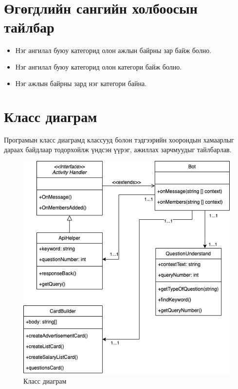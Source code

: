 \section{Өгөгдлийн сангийн холбоосын тайлбар}
\begin{itemize}
  \item Нэг ангилал буюу категорид олон ажлын байрны зар байж болно.
  \item Нэг ангилал буюу категорид олон категори байж болно. 
  \item Нэг ажлын байрны зард нэг категори байна.
\end{itemize}

\newpage
\section{Класс диаграм}
Програмын класс диаграмд классууд болон тэдгээрийн хоорондын хамаарлыг дараах байдлаар тодорхойлж үндсэн үүрэг, ажиллах зарчмуудыг тайлбарлав.
\begin{figure}[ht]
  \centering
  \includegraphics[width = \textwidth-2cm]{images/classDiagram.png}
  \caption{Класс диаграм} \label{fig:classDiagram}
\end{figure}
